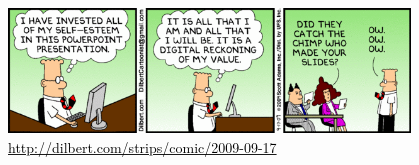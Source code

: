 \begin{tussenpagina}{}
    \strut

    \begin{figure}
        \includegraphics[width=0.95\textwidth]{images/dilbert.png}
        \vspace{-0.2cm}
        \caption{\href{http://dilbert.com/strips/comic/2009-09-17/}{\textcolor{black}{http://dilbert.com/strips/comic/2009-09-17}}}
    \end{figure}
\end{tussenpagina}


